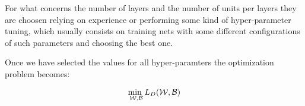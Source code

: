 For what concerns the number of layers and the number of units per layers they are choosen relying on experience or performing some kind of hyper-parameter tuning, which usually consists on training nets
with some different configurations of such parameters and choosing the best one.

Once we have selected the values for all hyper-paramters the optimization problem becomes:

\begin{equation}
\underset{\mathcal{W},\mathcal{B}}{\text{min  }} L_D(\mathcal{W},\mathcal{B}) \\
\end{equation}





